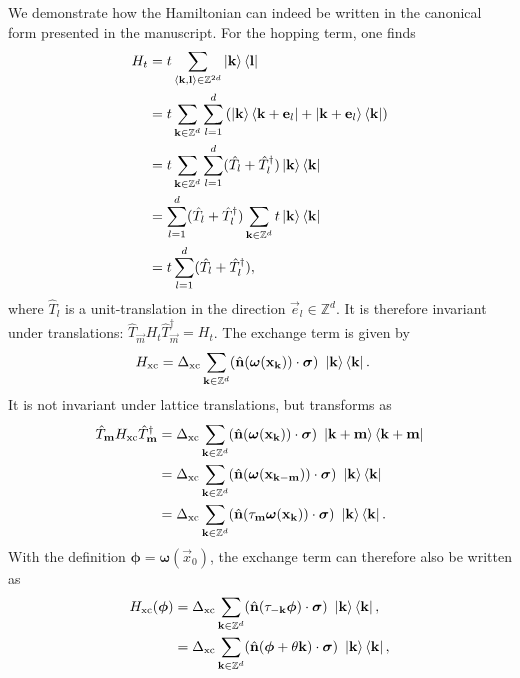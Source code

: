 \documentclass[
    10pt,
    aps,
    prb,
	longbibliography,
    twocolumn,
    floatfix,
    superscriptaddress,
]{revtex4-2}
\begin{document}
We demonstrate how the Hamiltonian can indeed be written in the canonical form presented in the manuscript.
For the hopping term, one finds
\begin{align}
H_t &= t \sum_{\braket{\mathbf{k},\mathbf{l}} \in \mathbb{Z}^{2d}}\ket{\mathbf{k}}\bra{\mathbf{l}}
\notag \\
&= 
	t \sum_{\mathbf{k} \in \mathbb{Z}^{d}}  \sum_{l=1}^d
	\left( \ket{\mathbf{k}}\bra{\mathbf{k}+\mathbf{e}_l } + \ket{\mathbf{k}+\mathbf{e}_l}\bra{\mathbf{k} } \right)
\notag \\
&= 
	t \sum_{\mathbf{k} \in \mathbb{Z}^{d}} \sum_{l=1}^d
	(\hat{T}_l + \hat{T}_l^\dagger)\ket{\mathbf{k}}\bra{\mathbf{k} } 
\notag \\
&= 
 \sum_{l=1}^d
(\hat{T}_l+ \hat{T}_l^\dagger) \sum_{\mathbf{k} \in \mathbb{Z}^{d}} t \ket{\mathbf{k}}\bra{\mathbf{k} } 
\notag \\
&= t
\sum_{l=1}^d
(\hat{T}_l + \hat{T}_l^\dagger)  ,
\end{align}
where $\hat{T}_l$ is a unit-translation in the direction $\vec{e}_l \in \mathbb{Z}^d$.
It is therefore invariant under translations:  $\hat{T}_\vec{m} 
H_t
\hat{T}_\vec{m}^\dagger = H_t$. 
The exchange term is given by
\begin{align}
	H_\mathrm{xc} &=
	\Delta_\mathrm{xc}\sum_{\mathbf{k} \in \mathbb{Z}^d}  (\hat{\mathbf{n}} (\boldsymbol{\omega}(\mathbf{x}_{\mathbf{k}})) \cdot \boldsymbol{\sigma}) ~ \ket{\mathbf{k}}\bra{\mathbf{k}} .
\end{align}
It is not invariant under lattice translations, but transforms as
\begin{align}
	\hat{T}_{\mathbf{m}}
	H_\mathrm{xc}
	\hat{T}_{\mathbf{m}}^\dagger
	& = \Delta_\mathrm{xc}\sum_{\mathbf{k} \in \mathbb{Z}^d}  (\hat{\mathbf{n}} (\boldsymbol{\omega}(\mathbf{x}_{\mathbf{k}})) \cdot \boldsymbol{\sigma}) ~ \ket{\mathbf{k}+\mathbf{m}}\bra{\mathbf{k}+\mathbf{m}}
		\notag \\
	& = \Delta_\mathrm{xc}\sum_{\mathbf{k} \in \mathbb{Z}^d}  (\hat{\mathbf{n}} (\boldsymbol{\omega}(\mathbf{x}_{\mathbf{k}-\mathbf{m}})) \cdot \boldsymbol{\sigma}) ~ \ket{\mathbf{k}}\bra{\mathbf{k}}
	\notag \\
	& = \Delta_\mathrm{xc}\sum_{\mathbf{k} \in \mathbb{Z}^d}  (\hat{\mathbf{n}} (\tau_{\mathbf{m}} \boldsymbol{\omega}(\mathbf{x}_{\mathbf{k}})) \cdot \boldsymbol{\sigma}) ~ \ket{\mathbf{k}}\bra{\mathbf{k}} . 
\end{align} 
With the definition $\boldsymbol{\phi} = \boldsymbol{\omega}(\vec{x}_0)$, the exchange term can therefore also be written as 
\begin{align}
	H_\mathrm{xc}( \boldsymbol{\phi} ) &=
	\Delta_\mathrm{xc}\sum_{\mathbf{k} \in \mathbb{Z}^d}  (\hat{\mathbf{n}} ( \tau_{\mathbf{-k}}\boldsymbol{\phi}) \cdot \boldsymbol{\sigma}) ~ \ket{\mathbf{k}}\bra{\mathbf{k}} ,
	\notag \\ & =
	\Delta_\mathrm{xc}\sum_{\mathbf{k} \in \mathbb{Z}^d}  (\hat{\mathbf{n}} (\boldsymbol{\phi} + \theta \mathbf{k}) \cdot \boldsymbol{\sigma}) ~ \ket{\mathbf{k}}\bra{\mathbf{k}},
\end{align}
\end{document}
